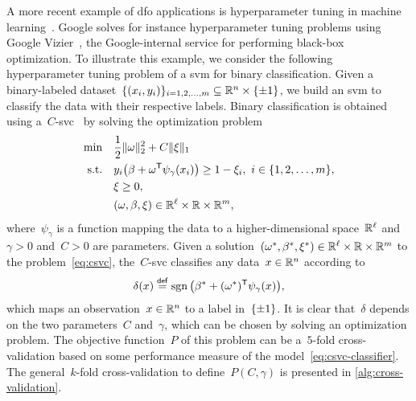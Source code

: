 A more recent example of \gls{dfo} applications is hyperparameter tuning in machine learning~\cite{Ghanbari_Scheinberg_2017}.
Google solves for instance hyperparameter tuning problems using Google Vizier~\cite{Golovin_Etal_2017}, the Google-internal service for performing black-box optimization.
To illustrate this example, we consider the following hyperparameter tuning problem of a \gls{svm} for binary classification.
Given a binary-labeled dataset~$\set{(\iter_i, y_i)}_{i = 1, 2, \dots, m} \subseteq \R^n \times \set{\pm 1}$, we build an \gls{svm} to classify the data with their respective labels.
Binary classification is obtained using a~$C$-\gls{svc}~\cite{Chang_Lin_2011} by solving the optimization problem
\begin{subequations}
    \label{eq:csvc}
    \begin{align}
        \min        & \quad \frac{1}{2} \norm{\omega}_2^2 + C \norm{\xi}_1\\
        \text{s.t.} & \quad y_i \big( \beta + \omega^{\T} \psi_{\gamma}(\iter_i) \big) \ge 1 - \xi_i, ~ i \in \set{1, 2, \dots, m},\\
                    & \quad \xi \ge 0,\\
                    & \quad (\omega, \beta, \xi) \in \R^{\ell} \times \R \times \R^m,
    \end{align}
\end{subequations}
where~$\psi_{\gamma}$ is a function mapping the data to a higher-dimensional space~$\mathbb{R}^{\ell}$ and~$\gamma > 0$ and~$C > 0$ are parameters.
Given a solution~$(\omega^{\ast}, \beta^{\ast}, \xi^{\ast}) \in \mathbb{R}^{\ell} \times \mathbb{R} \times \mathbb{R}^m$ to the problem~\cref{eq:csvc}, the~$C$-\gls{svc} classifies any data~$\iter \in \R^n$ according to
\begin{equation}
    \label{eq:csvc-classifier}
    \delta(\iter) \eqdef \sgn \big( \beta^{\ast} + (\omega^{\ast})^{\T} \psi_{\gamma}(\iter) \big),
\end{equation}
%
which maps an observation~$\iter \in \R^n$ to a label in~$\{\pm 1\}$.
It is clear that~$\delta$ depends on the two parameters~$C$ and~$\gamma$, which can be chosen by solving an optimization problem.
The objective function~$P$ of this problem can be a~$5$-fold cross-validation based on some performance measure of the model~\cref{eq:csvc-classifier}.
The general~$k$-fold cross-validation to define~$P(C, \gamma)$ is presented in \cref{alg:cross-validation}.

